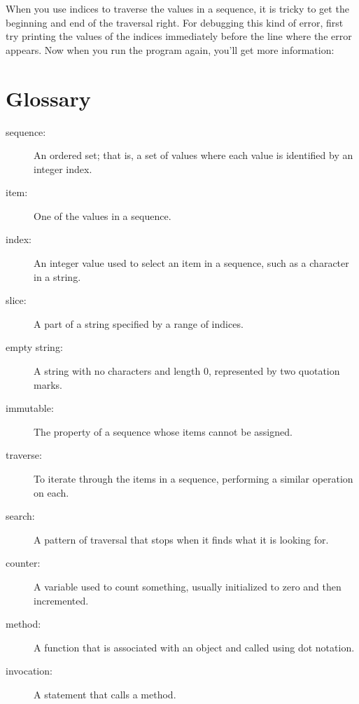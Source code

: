 \documentclass[10pt]{book}
\begin{document}

When you use indices to traverse the values in a sequence,
it is tricky to get the beginning and end of the traversal
right. For debugging this kind of error, first try printing
the values of the indices immediately before the line where 
the error appears. Now when you run the program again, you'll 
get more information:


\section{Glossary}

\begin{description}
\item[sequence:] An ordered set; that is, a set of
values where each value is identified by an integer index.

\item[item:] One of the values in a sequence.

\item[index:] An integer value used to select an item in
a sequence, such as a character in a string.

\item[slice:] A part of a string specified by a range of indices.

\item[empty string:] A string with no characters and length 0, represented
by two quotation marks.

\item[immutable:] The property of a sequence whose items cannot
be assigned.

\item[traverse:] To iterate through the items in a sequence,
performing a similar operation on each.

\item[search:] A pattern of traversal that stops
when it finds what it is looking for.

\item[counter:] A variable used to count something, usually initialized
to zero and then incremented.

\item[method:] A function that is associated with an object and called
using dot notation.

\item[invocation:] A statement that calls a method.

\end{description}
\end{document}
